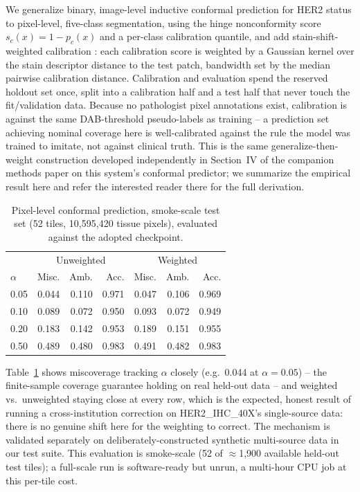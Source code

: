 \documentclass[conference]{IEEEtran}
\begin{document}
We generalize binary, image-level inductive conformal prediction for HER2
status \cite{pintawong2025,vovk2005} to pixel-level, five-class
segmentation, using the hinge nonconformity score $s_c(x) = 1 - p_c(x)$
\cite{sadinle2019} and a per-class calibration quantile, and add
stain-shift-weighted calibration \cite{tibshirani2019}: each calibration
score is weighted by a Gaussian kernel over the stain descriptor distance
to the test patch, bandwidth set by the median pairwise calibration
distance. Calibration and evaluation spend the reserved holdout set once,
split into a calibration half and a test half that never touch the
fit/validation data. Because no pathologist pixel annotations exist,
calibration is against the same DAB-threshold pseudo-labels as training --
a prediction set achieving nominal coverage here is well-calibrated
against the rule the model was trained to imitate, not against clinical
truth. This is the same generalize-then-weight construction developed
independently in Section~IV of the companion methods paper on this
system's conformal predictor; we summarize the empirical result here and
refer the interested reader there for the full derivation.

\begin{table}[t]
\centering
\caption{Pixel-level conformal prediction, smoke-scale test set (52 tiles,
10{,}595{,}420 tissue pixels), evaluated against the adopted checkpoint.}
\label{tab:conformal}
\begin{tabular}{lrrrrrr}
\toprule
& \multicolumn{3}{c}{Unweighted} & \multicolumn{3}{c}{Weighted} \\
$\alpha$ & Misc. & Amb. & Acc. & Misc. & Amb. & Acc. \\
\midrule
0.05 & 0.044 & 0.110 & 0.971 & 0.047 & 0.106 & 0.969 \\
0.10 & 0.089 & 0.072 & 0.950 & 0.093 & 0.072 & 0.949 \\
0.20 & 0.183 & 0.142 & 0.953 & 0.189 & 0.151 & 0.955 \\
0.50 & 0.489 & 0.480 & 0.983 & 0.491 & 0.482 & 0.983 \\
\bottomrule
\end{tabular}
\end{table}

Table~\ref{tab:conformal} shows miscoverage tracking $\alpha$ closely
(e.g.\ 0.044 at $\alpha=0.05$) -- the finite-sample coverage guarantee
holding on real held-out data -- and weighted vs.\ unweighted staying
close at every row, which is the expected, honest result of running a
cross-institution correction on HER2\_IHC\_40X's single-source data: there
is no genuine shift here for the weighting to correct. The mechanism is
validated separately on deliberately-constructed synthetic multi-source
data in our test suite. This evaluation is smoke-scale (52 of
$\approx$1{,}900 available held-out test tiles); a full-scale run is
software-ready but unrun, a multi-hour CPU job at this per-tile cost.
\end{document}
